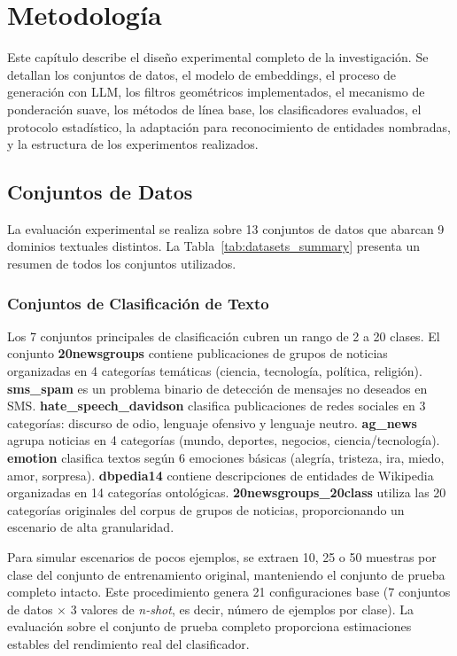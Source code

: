 
\chapter{Metodología}
\label{ch:metodologia}

Este capítulo describe el diseño experimental completo de la investigación. Se detallan los conjuntos de datos, el modelo de embeddings, el proceso de generación con LLM, los filtros geométricos implementados, el mecanismo de ponderación suave, los métodos de línea base, los clasificadores evaluados, el protocolo estadístico, la adaptación para reconocimiento de entidades nombradas, y la estructura de los experimentos realizados.

\section{Conjuntos de Datos}
\label{sec:datasets}

La evaluación experimental se realiza sobre 13 conjuntos de datos que abarcan 9 dominios textuales distintos. La Tabla~\ref{tab:datasets_summary} presenta un resumen de todos los conjuntos utilizados.



\subsection{Conjuntos de Clasificación de Texto}

Los 7 conjuntos principales de clasificación cubren un rango de 2 a 20 clases. El conjunto \textbf{20newsgroups} contiene publicaciones de grupos de noticias organizadas en 4 categorías temáticas (ciencia, tecnología, política, religión). \textbf{sms\_spam} es un problema binario de detección de mensajes no deseados en SMS. \textbf{hate\_speech\_davidson} clasifica publicaciones de redes sociales en 3 categorías: discurso de odio, lenguaje ofensivo y lenguaje neutro. \textbf{ag\_news} agrupa noticias en 4 categorías (mundo, deportes, negocios, ciencia/tecnología). \textbf{emotion} clasifica textos según 6 emociones básicas (alegría, tristeza, ira, miedo, amor, sorpresa). \textbf{dbpedia14} contiene descripciones de entidades de Wikipedia organizadas en 14 categorías ontológicas. \textbf{20newsgroups\_20class} utiliza las 20 categorías originales del corpus de grupos de noticias, proporcionando un escenario de alta granularidad.

Para simular escenarios de pocos ejemplos, se extraen 10, 25 o 50 muestras por clase del conjunto de entrenamiento original, manteniendo el conjunto de prueba completo intacto. Este procedimiento genera 21 configuraciones base (7 conjuntos de datos $\times$ 3 valores de \textit{n-shot}, es decir, número de ejemplos por clase). La evaluación sobre el conjunto de prueba completo proporciona estimaciones estables del rendimiento real del clasificador.

